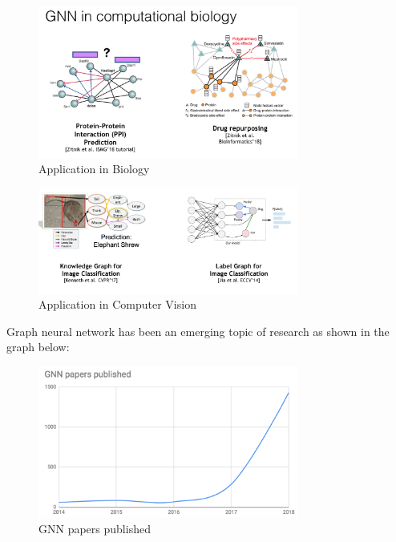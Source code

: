 \begin{figure}[ht]
\begin{center}
  \includegraphics[width=3.38in]{figs/Biology.png}
\end{center}
   \caption{Application in Biology}
\label{fig:CV}
\end{figure}

\begin{figure}[ht]
\begin{center}
  \includegraphics[width=3.38in]{figs/Computer_Vision.png}
\end{center}
   \caption{Application in Computer Vision}
\label{fig:CV}
\end{figure}

Graph neural network has been an emerging topic of research as shown in the graph below:

\begin{figure}[ht]
\begin{center}
  \includegraphics[width=3.38in]{figs/GNN Papers Published.png}
\end{center}
   \caption{GNN papers published}
\label{fig:CV}
\end{figure}

